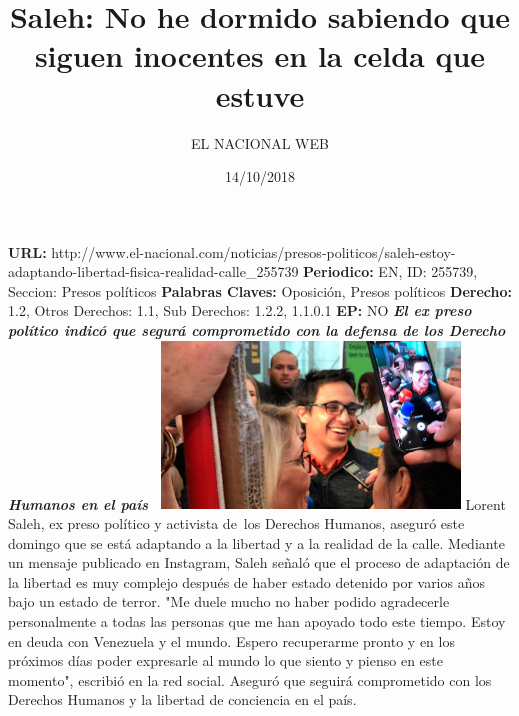\documentclass{article}%
\title{\textbf{Saleh: No he dormido sabiendo que siguen inocentes en la celda que estuve}}%
\author{EL NACIONAL WEB}%
\date{14/10/2018}%
\begin{document}
%
\normalsize%
\maketitle%
\textbf{URL: }%
http://www.el{-}nacional.com/noticias/presos{-}politicos/saleh{-}estoy{-}adaptando{-}libertad{-}fisica{-}realidad{-}calle\_255739\newline%
%
\textbf{Periodico: }%
EN, %
ID: %
255739, %
Seccion: %
Presos políticos\newline%
%
\textbf{Palabras Claves: }%
Oposición, Presos políticos\newline%
%
\textbf{Derecho: }%
1.2, %
Otros Derechos: %
1.1, %
Sub Derechos: %
1.2.2, 1.1.0.1\newline%
%
\textbf{EP: }%
NO\newline%
\newline%
%
\textbf{\textit{El ex preso político indicó que segurá comprometido con la defensa de los Derecho Humanos en el país~}}%
\newline%
\newline%
%
\includegraphics[width=300px]{221.jpg}%
\newline%
%
Lorent Saleh, ex preso político y activista de~los Derechos Humanos, aseguró este domingo que se está adaptando a la libertad y a la realidad de la calle.%
\newline%
%
Mediante un mensaje publicado en Instagram, Saleh señaló que el proceso de adaptación de la libertad es muy complejo después de haber estado detenido por varios años bajo un estado de terror.%
\newline%
%
"Me duele mucho no haber podido agradecerle personalmente a todas las personas que me han apoyado todo este tiempo. Estoy en deuda con Venezuela y el mundo. Espero recuperarme pronto y en los próximos días poder expresarle al mundo lo que siento y pienso en este momento", escribió en la red social.%
\newline%
%
Aseguró que seguirá comprometido con los Derechos Humanos y la libertad de conciencia en el país.%
\newline%
%
\end{document}
